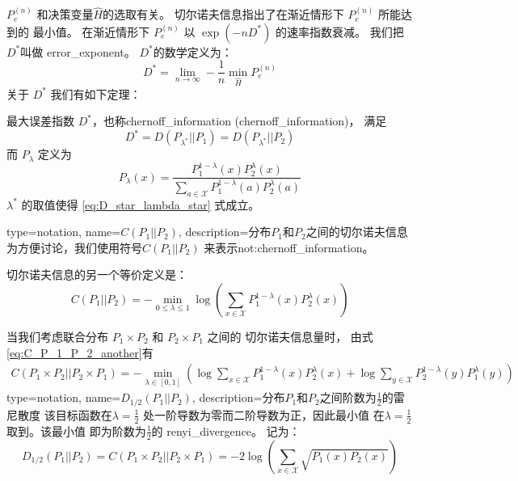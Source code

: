 $P_e^{(n)}$ 和决策变量$\widehat{H}$的选取有关。
切尔诺夫信息指出了在渐近情形下 $P_e^{(n)}$ 所能达到的
最小值。
在渐近情形下 $P_e^{(n)}$ 以 $\exp(-n D^*)$ 的速率指数衰减。
我们把$D^*$叫做 \gls{error_exponent}。
$D^*$的数学定义为：
\begin{equation}
 D^* = \lim_{n\to \infty} -\frac{1}{n} \min_{\widehat{H}}
 P^{(n)}_e
\end{equation}
关于 $D^*$ 我们有如下定理：
\begin{theorem}
  最大误差指数 $D^*$，也称\gls{chernoff_information} (\glsdesc{chernoff_information})，
  满足
  \begin{equation}\label{eq:D_star_lambda_star}
    D^* = D(P_{\lambda^*} || P_1) = D(P_{\lambda^*}|| P_2)
  \end{equation}
  而 $P_{\lambda}$ 定义为
  \begin{equation}\label{eq:P_lambda_x}
    P_{\lambda}(x) = \frac{P^{1-\lambda}_1 (x) P^{\lambda}_2 (x)}
    {\sum_{a \in \mathcal{X}} P^{1-\lambda}_1 (a) P^{\lambda}_2 (a)}
  \end{equation}
  $\lambda^*$ 的取值使得  \eqref{eq:D_star_lambda_star} 式成立。
\end{theorem}

{
  type=notation,
  name={$C(P_1||P_2)$},
  description={分布$P_1$和$P_2$之间的切尔诺夫信息}
}
为方便讨论，我们使用符号$C(P_1||P_2)$
来表示\glsdesc{not:chernoff_information}。

切尔诺夫信息的另一个等价定义是：
\begin{equation}\label{eq:C_P_1_P_2_another}
  C(P_1||P_2) = -\min_{0\leq \lambda \leq 1}
  \log \left(\sum_{x \in \mathcal{X}}
  P^{1-\lambda}_1(x)P^{\lambda}_2(x)
  \right)
\end{equation}

当我们考虑联合分布 $P_1 \times P_2$
和 $P_2 \times P_1$ 之间的  切尔诺夫信息量时，
由式 \eqref{eq:C_P_1_P_2_another}有
\begin{align*}
  C(P_1 \times P_2||P_2 \times P_1) 
  = -\min_{\lambda \in [0,1]}
  \left(\log \sum_{x\in \mathcal{X}}
  P_1^{1-\lambda}(x) P_2^{\lambda}(x) 
  +\log \sum_{y\in \mathcal{X}}
  P_2^{1-\lambda}(y) P_1^{\lambda}(y) 
  \right)
  \end{align*}
{
  type=notation,
  name={$D_{1/2}(P_1||P_2)$},
  description={分布$P_1$和$P_2$之间阶数为$\frac{1}{2}$的雷尼散度}
}
该目标函数在$\lambda=\frac{1}{2}$
处一阶导数为零而二阶导数为正，因此最小值
在$\lambda=\frac{1}{2}$取到。该最小值
即为阶数为$\frac{1}{2}$的 \gls{renyi_divergence}。
记为：
\begin{equation}\label{eq:renyi_divergence}
  D_{1/2}(P_1 || P_2) = C(P_1 \times P_2||P_2 \times P_1)=
  -2\log \left(\sum_{x \in \mathcal{X}}
  \sqrt{P_1(x)P_2(x)} \right)
\end{equation}

